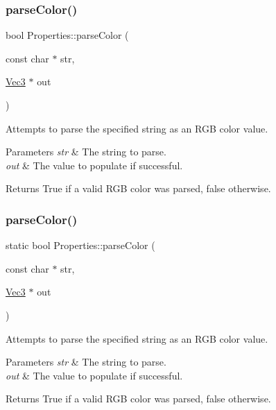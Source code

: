 \subsubsection{\texorpdfstring{parse\+Color()}{parseColor()}\hspace{0.1cm}{\footnotesize\ttfamily [1/4]}}
{\footnotesize\ttfamily bool Properties\+::parse\+Color (\begin{DoxyParamCaption}\item[{const char $\ast$}]{str,  }\item[{\hyperlink{classVec3}{Vec3} $\ast$}]{out }\end{DoxyParamCaption})\hspace{0.3cm}{\ttfamily [static]}}

Attempts to parse the specified string as an R\+GB color value.


\begin{DoxyParams}{Parameters}
{\em str} & The string to parse. \\
\hline
{\em out} & The value to populate if successful.\\
\hline
\end{DoxyParams}
\begin{DoxyReturn}{Returns}
True if a valid R\+GB color was parsed, false otherwise. 
\end{DoxyReturn}
\mbox{\label{classProperties_a8ce9d838784b1b95087f98a27eba3500}} 
\subsubsection{\texorpdfstring{parse\+Color()}{parseColor()}\hspace{0.1cm}{\footnotesize\ttfamily [2/4]}}
{\footnotesize\ttfamily static bool Properties\+::parse\+Color (\begin{DoxyParamCaption}\item[{const char $\ast$}]{str,  }\item[{\hyperlink{classVec3}{Vec3} $\ast$}]{out }\end{DoxyParamCaption})\hspace{0.3cm}{\ttfamily [static]}}

Attempts to parse the specified string as an R\+GB color value.


\begin{DoxyParams}{Parameters}
{\em str} & The string to parse. \\
\hline
{\em out} & The value to populate if successful.\\
\hline
\end{DoxyParams}
\begin{DoxyReturn}{Returns}
True if a valid R\+GB color was parsed, false otherwise. 
\end{DoxyReturn}
\mbox{\label{classProperties_af897fb4588ee9cbcf13af96c3043b380}} 
